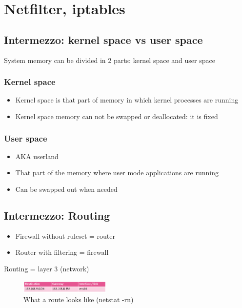 \documentclass{article}
\begin{document}
\section{Netfilter, iptables}

\subsection{Intermezzo: kernel space vs user space}

System memory can be divided in 2 parts: kernel space and user space

\subsubsection{Kernel space}

\begin{itemize}
    \item Kernel space is that part of memory in which kernel processes are running
    \item Kernel space memory can not be swapped or deallocated: it is fixed
\end{itemize}

\subsubsection{User space}

\begin{itemize}
    \item AKA userland
    \item That part of the memory where user mode applications are running
    \item Can be swapped out when needed
\end{itemize}

\subsection{Intermezzo: Routing}

\begin{itemize}
    \item Firewall without ruleset = router
    \item Router with filtering = firewall
\end{itemize}

Routing = layer 3 (network)

\begin{figure}[H]
    \centering
    \includegraphics[width=0.4\textwidth]{routing-table.png}
    \caption{What a route looks like (netstat -rn)}
\end{figure}
\end{document}
